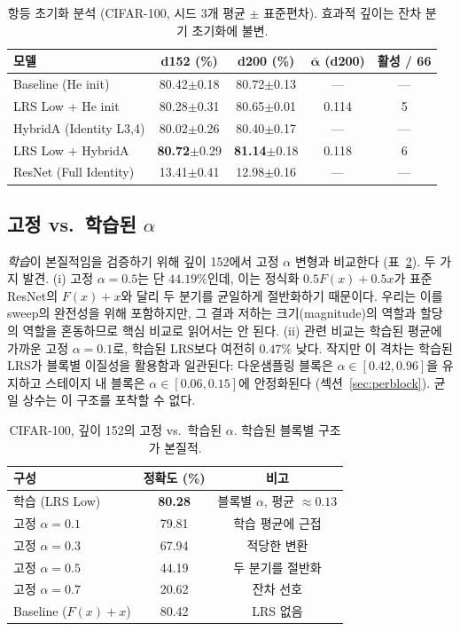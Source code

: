 \documentclass{bmvc2k}
\begin{document}
\begin{table}[!ht]
\centering
\small
\caption{항등 초기화 분석 (CIFAR-100, 시드 3개 평균 $\pm$ 표준편차). 효과적 깊이는 잔차 분기 초기화에 불변.}
\label{tab:identity_init}
\begin{tabular}{lcccc}
\toprule
\textbf{모델} & \textbf{d152 (\%)} & \textbf{d200 (\%)} & $\mathbf{\bar{\alpha}}$ \textbf{(d200)} & \textbf{활성 / 66} \\
\midrule
Baseline (He init) & 80.42$\pm$0.18 & 80.72$\pm$0.13 & --- & --- \\
LRS Low + He init & 80.28$\pm$0.31 & 80.65$\pm$0.01 & 0.114 & 5 \\
HybridA (Identity L3,4) & 80.02$\pm$0.26 & 80.40$\pm$0.17 & --- & --- \\
LRS Low + HybridA & \textbf{80.72}$\pm$0.29 & \textbf{81.14}$\pm$0.18 & 0.118 & 6 \\
ResNet (Full Identity) & 13.41$\pm$0.41 & 12.98$\pm$0.16 & --- & --- \\
\bottomrule
\end{tabular}
\end{table}

\subsection{고정 vs.\ 학습된 $\alpha$}
\label{sec:fixed_alpha}

\emph{학습}이 본질적임을 검증하기 위해 깊이 152에서 고정 $\alpha$ 변형과 비교한다 (표~\ref{tab:fixed_alpha}). 두 가지 발견. (i) 고정 $\alpha = 0.5$는 단 $44.19\%$인데, 이는 정식화 $0.5 F(x) + 0.5 x$가 표준 ResNet의 $F(x) + x$와 달리 두 분기를 균일하게 절반화하기 때문이다. 우리는 이를 sweep의 완전성을 위해 포함하지만, 그 결과 저하는 크기(magnitude)의 역할과 할당의 역할을 혼동하므로 핵심 비교로 읽어서는 안 된다. (ii) 관련 비교는 학습된 평균에 가까운 고정 $\alpha = 0.1$로, 학습된 LRS보다 여전히 $0.47\%$ 낮다. 작지만 이 격차는 학습된 LRS가 블록별 이질성을 활용함과 일관된다: 다운샘플링 블록은 $\alpha \in [0.42, 0.96]$을 유지하고 스테이지 내 블록은 $\alpha \in [0.06, 0.15]$에 안정화된다 (섹션~\ref{sec:perblock}). 균일 상수는 이 구조를 포착할 수 없다.

\begin{table}[!ht]
\centering
\small
\caption{CIFAR-100, 깊이 152의 고정 vs.\ 학습된 $\alpha$. 학습된 블록별 구조가 본질적.}
\label{tab:fixed_alpha}
\begin{tabular}{lcc}
\toprule
\textbf{구성} & \textbf{정확도 (\%)} & \textbf{비고} \\
\midrule
학습 (LRS Low) & \textbf{80.28} & 블록별 $\alpha$, 평균 $\approx 0.13$ \\
고정 $\alpha = 0.1$ & 79.81 & 학습 평균에 근접 \\
고정 $\alpha = 0.3$ & 67.94 & 적당한 변환 \\
고정 $\alpha = 0.5$ & 44.19 & 두 분기를 절반화 \\
고정 $\alpha = 0.7$ & 20.62 & 잔차 선호 \\
\midrule
Baseline ($F(x){+}x$) & 80.42 & LRS 없음 \\
\bottomrule
\end{tabular}
\end{table}
\end{document}
